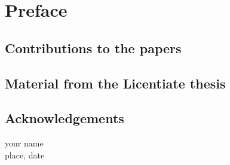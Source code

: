 \chapter{Preface}
\label{ch:pre}



\section*{Contributions to the papers}

\vspace{0.5cm}
\begin{description}[align=left, labelindent=0cm]
\setlength\itemsep{0.5cm}
	\item[\PaperI.] 
	\item[\PaperII.] 
\end{description}

\section*{Material from the Licentiate thesis}

\section*{Acknowledgements}

\vspace{0.5cm}
\begin{flushright}
 your name \\
 place, date
\end{flushright}
